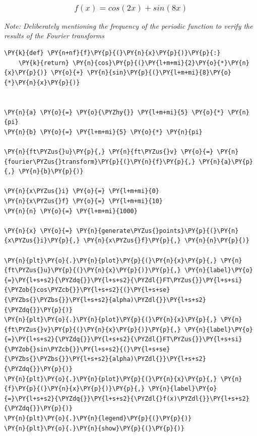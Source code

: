     \begin{center}
    \end{center}
    { \hspace*{\fill} \\}
    
    \hypertarget{fx-cos2x-sin8x}{%
\subsubsection{\texorpdfstring{\[f(x) = cos(2x) + sin(8x)\]}{f(x) = cos(2x) + sin(8x)}}\label{fx-cos2x-sin8x}}

\emph{Note: Deliberately mentioning the frequency of the periodic
function to verify the results of the Fourier transforms}

    \begin{tcolorbox}[breakable, size=fbox, boxrule=1pt, pad at break*=1mm,colback=cellbackground, colframe=cellborder]
\begin{Verbatim}[commandchars=\\\{\}]
\PY{k}{def} \PY{n+nf}{f}\PY{p}{(}\PY{n}{x}\PY{p}{)}\PY{p}{:}
    \PY{k}{return} \PY{n}{cos}\PY{p}{(}\PY{l+m+mi}{2}\PY{o}{*}\PY{n}{x}\PY{p}{)} \PY{o}{+} \PY{n}{sin}\PY{p}{(}\PY{l+m+mi}{8}\PY{o}{*}\PY{n}{x}\PY{p}{)}


\PY{n}{a} \PY{o}{=} \PY{o}{\PYZhy{}} \PY{l+m+mi}{5} \PY{o}{*} \PY{n}{pi}
\PY{n}{b} \PY{o}{=} \PY{l+m+mi}{5} \PY{o}{*} \PY{n}{pi}

\PY{n}{ft\PYZus{}u}\PY{p}{,} \PY{n}{ft\PYZus{}v} \PY{o}{=} \PY{n}{fourier\PYZus{}transform}\PY{p}{(}\PY{n}{f}\PY{p}{,} \PY{n}{a}\PY{p}{,} \PY{n}{b}\PY{p}{)}

\PY{n}{x\PYZus{}i} \PY{o}{=} \PY{l+m+mi}{0}
\PY{n}{x\PYZus{}f} \PY{o}{=} \PY{l+m+mi}{10}
\PY{n}{n} \PY{o}{=} \PY{l+m+mi}{1000}

\PY{n}{x} \PY{o}{=} \PY{n}{generate\PYZus{}points}\PY{p}{(}\PY{n}{x\PYZus{}i}\PY{p}{,} \PY{n}{x\PYZus{}f}\PY{p}{,} \PY{n}{n}\PY{p}{)}

\PY{n}{plt}\PY{o}{.}\PY{n}{plot}\PY{p}{(}\PY{n}{x}\PY{p}{,} \PY{n}{ft\PYZus{}u}\PY{p}{(}\PY{n}{x}\PY{p}{)}\PY{p}{,} \PY{n}{label}\PY{o}{=}\PY{l+s+s2}{\PYZdq{}}\PY{l+s+s2}{\PYZdl{}FT\PYZus{}}\PY{l+s+si}{\PYZob{}cos\PYZcb{}}\PY{l+s+s2}{(}\PY{l+s+se}{\PYZbs{}\PYZbs{}}\PY{l+s+s2}{alpha)\PYZdl{}}\PY{l+s+s2}{\PYZdq{}}\PY{p}{)}
\PY{n}{plt}\PY{o}{.}\PY{n}{plot}\PY{p}{(}\PY{n}{x}\PY{p}{,} \PY{n}{ft\PYZus{}v}\PY{p}{(}\PY{n}{x}\PY{p}{)}\PY{p}{,} \PY{n}{label}\PY{o}{=}\PY{l+s+s2}{\PYZdq{}}\PY{l+s+s2}{\PYZdl{}FT\PYZus{}}\PY{l+s+si}{\PYZob{}sin\PYZcb{}}\PY{l+s+s2}{(}\PY{l+s+se}{\PYZbs{}\PYZbs{}}\PY{l+s+s2}{alpha)\PYZdl{}}\PY{l+s+s2}{\PYZdq{}}\PY{p}{)}
\PY{n}{plt}\PY{o}{.}\PY{n}{plot}\PY{p}{(}\PY{n}{x}\PY{p}{,} \PY{n}{f}\PY{p}{(}\PY{n}{x}\PY{p}{)}\PY{p}{,} \PY{n}{label}\PY{o}{=}\PY{l+s+s2}{\PYZdq{}}\PY{l+s+s2}{\PYZdl{}f(x)\PYZdl{}}\PY{l+s+s2}{\PYZdq{}}\PY{p}{)}
\PY{n}{plt}\PY{o}{.}\PY{n}{legend}\PY{p}{(}\PY{p}{)}
\PY{n}{plt}\PY{o}{.}\PY{n}{show}\PY{p}{(}\PY{p}{)}
\end{Verbatim}
\end{tcolorbox}

